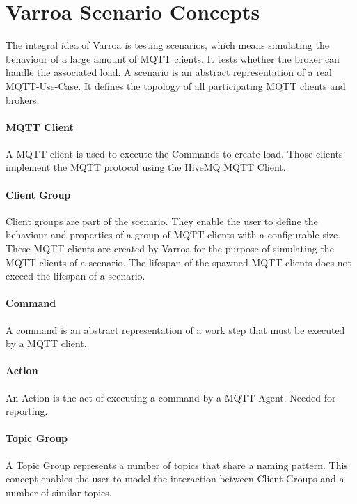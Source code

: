 
\section{Varroa Scenario Concepts}
The integral idea of Varroa is testing scenarios, which means simulating the behaviour of a large amount of MQTT clients.
It tests whether the broker can handle the associated load.
A scenario is an abstract representation of a real MQTT-Use-Case.
It defines the topology of all participating MQTT clients and brokers.

\paragraph{MQTT Client}
A MQTT client is used to execute the Commands to create load.
Those clients implement the MQTT protocol using the HiveMQ MQTT Client.

\paragraph{Client Group}
Client groups are part of the scenario.
They enable the user to define the behaviour and properties of a group of MQTT clients with a configurable size.
These MQTT clients are created by Varroa for the purpose of simulating the MQTT clients of a scenario.
The lifespan of the spawned MQTT clients does not exceed the lifespan of a scenario.

\paragraph{Command}
A command is an abstract representation of a work step that must be executed by a MQTT client.

\paragraph{Action}
An Action is the act of executing a command by a MQTT Agent.
Needed for reporting.

\paragraph{Topic Group}
A Topic Group represents a number of topics that share a naming pattern.
This concept enables the user to model the interaction between Client Groups and a number of similar topics.

